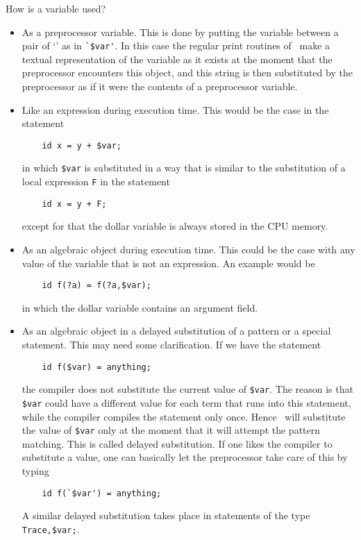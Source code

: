 How is a variable used?
\begin{itemize}
\item As a preprocessor variable. This is done 
by putting the variable between a pair of `' as in \verb:`$var':. In this 
case the regular print routines of \FORM\ make a textual 
representation of 
the variable as it exists at the moment that the preprocessor encounters 
this object, and this string is then substituted by the preprocessor as if 
it were the contents of a preprocessor variable.
\item Like an expression during execution time. This would be the case in 
the statement
\begin{verbatim}
    id x = y + $var;
\end{verbatim}
in which \verb:$var: is substituted 
in a way that is similar to the substitution of a local expression \verb:F: 
in the statement
\begin{verbatim}
    id x = y + F;
\end{verbatim}
except for that the dollar variable is always stored in the CPU memory.
\item As an algebraic object during execution time. This could be the case 
with any value of the variable that is not an expression. An example would 
be
\begin{verbatim}
    id f(?a) = f(?a,$var);
\end{verbatim}
in which the dollar variable contains an 
argument field.
\item As an algebraic object in a delayed substitution of a pattern or a 
special statement. This may need some clarification. If we have the 
statement
\begin{verbatim}
    id f($var) = anything;
\end{verbatim}
the compiler does not substitute 
the current value of \verb:$var:. The reason is that \verb:$var: could have 
a different value for each term that runs into this statement, while the 
compiler compiles the statement only once. Hence \FORM\ will substitute the 
value of \verb:$var: only at the moment that it will attempt the pattern 
matching. This is called delayed 
substitution. If one likes the compiler to 
substitute a value, one can basically let the preprocessor take care of 
this by typing
\begin{verbatim}
    id f(`$var') = anything;
\end{verbatim}
A similar delayed 
substitution takes place in statements of the type \verb:Trace,$var;:.
\end{itemize}

